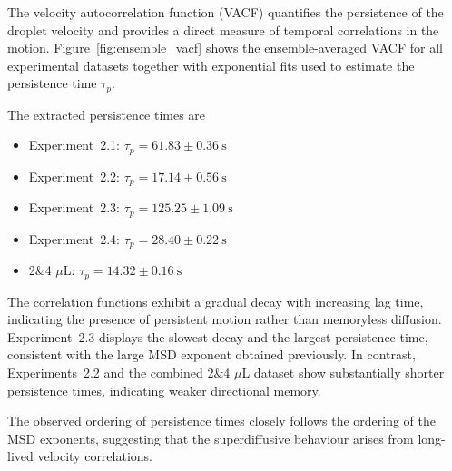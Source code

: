 The velocity autocorrelation function (VACF) quantifies the persistence of the droplet velocity and provides a direct measure of temporal correlations in the motion. Figure~\ref{fig:ensemble_vacf} shows the ensemble-averaged VACF for all experimental datasets together with exponential fits used to estimate the persistence time $\tau_p$.

The extracted persistence times are

\begin{itemize}
\item Experiment~2.1: $\tau_p = 61.83 \pm 0.36~\mathrm{s}$
\item Experiment~2.2: $\tau_p = 17.14 \pm 0.56~\mathrm{s}$
\item Experiment~2.3: $\tau_p = 125.25 \pm 1.09~\mathrm{s}$
\item Experiment~2.4: $\tau_p = 28.40 \pm 0.22~\mathrm{s}$
\item 2\&4 $\mu$L: $\tau_p = 14.32 \pm 0.16~\mathrm{s}$
\end{itemize}

The correlation functions exhibit a gradual decay with increasing lag time\cite{balakrishnan2021}, indicating the presence of persistent motion rather than memoryless diffusion. Experiment~2.3 displays the slowest decay and the largest persistence time, consistent with the large MSD exponent obtained previously. In contrast, Experiments~2.2 and the combined 2\&4 $\mu$L dataset show substantially shorter persistence times, indicating weaker directional memory.

The observed ordering of persistence times closely follows the ordering of the MSD exponents, suggesting that the superdiffusive behaviour arises from long-lived velocity correlations.

